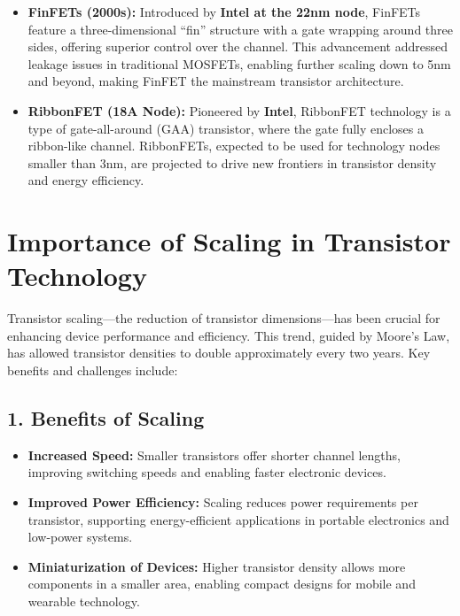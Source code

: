\documentclass[12pt]{report}
\begin{document}
\begin{titlepage}
\begin{itemize}
    \item \textbf{FinFETs (2000s):} Introduced by \textbf{Intel at the 22nm node}, FinFETs feature a three-dimensional “fin” structure with a gate wrapping around three sides, offering superior control over the channel. This advancement addressed leakage issues in traditional MOSFETs, enabling further scaling down to 5nm and beyond, making FinFET the mainstream transistor architecture.
    \item \textbf{RibbonFET (18A Node):} Pioneered by \textbf{Intel}, RibbonFET technology is a type of gate-all-around (GAA) transistor, where the gate fully encloses a ribbon-like channel. RibbonFETs, expected to be used for technology nodes smaller than 3nm, are projected to drive new frontiers in transistor density and energy efficiency.
\end{itemize}

\section{Importance of Scaling in Transistor Technology}

Transistor scaling—the reduction of transistor dimensions—has been crucial for enhancing device performance and efficiency. This trend, guided by Moore's Law, has allowed transistor densities to double approximately every two years. Key benefits and challenges include:

\subsection*{1. Benefits of Scaling}
\begin{itemize}
    \item \textbf{Increased Speed:} Smaller transistors offer shorter channel lengths, improving switching speeds and enabling faster electronic devices.
    \item \textbf{Improved Power Efficiency:} Scaling reduces power requirements per transistor, supporting energy-efficient applications in portable electronics and low-power systems.
    \item \textbf{Miniaturization of Devices:} Higher transistor density allows more components in a smaller area, enabling compact designs for mobile and wearable technology.
\end{itemize}


\end{titlepage}
\end{document}
